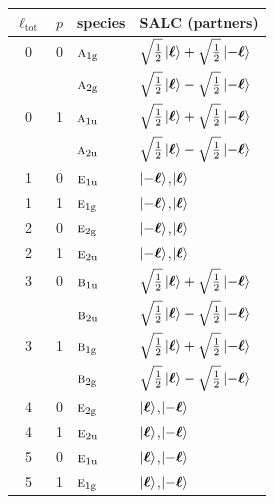 \documentclass[11pt]{article}
\newcommand{\irr}[1]{\text{\normalfont\scshape #1}}
\newcommand{\ptag}[1]{\mathrm{#1}}
\begin{document}
\begin{longtable}{c c l l}\hline $\ell_{\mathrm{tot}}$ & $p$ & species & SALC (partners)\\ \hline\endhead

0 & 0 & $\irr{a}_{1\ptag{g}}$ & $\sqrt{\tfrac{1}{2}}\ket{\boldsymbol\ell}+\sqrt{\tfrac{1}{2}}\ket{-\boldsymbol\ell}$\\

& & $\irr{a}_{2\ptag{g}}$ & $\sqrt{\tfrac{1}{2}}\ket{\boldsymbol\ell}-\sqrt{\tfrac{1}{2}}\ket{-\boldsymbol\ell}$\\

0 & 1 & $\irr{a}_{1\ptag{u}}$ & $\sqrt{\tfrac{1}{2}}\ket{\boldsymbol\ell}+\sqrt{\tfrac{1}{2}}\ket{-\boldsymbol\ell}$\\

& & $\irr{a}_{2\ptag{u}}$ & $\sqrt{\tfrac{1}{2}}\ket{\boldsymbol\ell}-\sqrt{\tfrac{1}{2}}\ket{-\boldsymbol\ell}$\\

1 & 0 & $\irr{e}_{1\ptag{u}}$ & $\ket{-\boldsymbol\ell}$,\quad $\ket{\boldsymbol\ell}$\\

1 & 1 & $\irr{e}_{1\ptag{g}}$ & $\ket{-\boldsymbol\ell}$,\quad $\ket{\boldsymbol\ell}$\\

2 & 0 & $\irr{e}_{2\ptag{g}}$ & $\ket{-\boldsymbol\ell}$,\quad $\ket{\boldsymbol\ell}$\\

2 & 1 & $\irr{e}_{2\ptag{u}}$ & $\ket{-\boldsymbol\ell}$,\quad $\ket{\boldsymbol\ell}$\\

3 & 0 & $\irr{b}_{1\ptag{u}}$ & $\sqrt{\tfrac{1}{2}}\ket{\boldsymbol\ell}+\sqrt{\tfrac{1}{2}}\ket{-\boldsymbol\ell}$\\

& & $\irr{b}_{2\ptag{u}}$ & $\sqrt{\tfrac{1}{2}}\ket{\boldsymbol\ell}-\sqrt{\tfrac{1}{2}}\ket{-\boldsymbol\ell}$\\

3 & 1 & $\irr{b}_{1\ptag{g}}$ & $\sqrt{\tfrac{1}{2}}\ket{\boldsymbol\ell}+\sqrt{\tfrac{1}{2}}\ket{-\boldsymbol\ell}$\\

& & $\irr{b}_{2\ptag{g}}$ & $\sqrt{\tfrac{1}{2}}\ket{\boldsymbol\ell}-\sqrt{\tfrac{1}{2}}\ket{-\boldsymbol\ell}$\\

4 & 0 & $\irr{e}_{2\ptag{g}}$ & $\ket{\boldsymbol\ell}$,\quad $\ket{-\boldsymbol\ell}$\\

4 & 1 & $\irr{e}_{2\ptag{u}}$ & $\ket{\boldsymbol\ell}$,\quad $\ket{-\boldsymbol\ell}$\\

5 & 0 & $\irr{e}_{1\ptag{u}}$ & $\ket{\boldsymbol\ell}$,\quad $\ket{-\boldsymbol\ell}$\\

5 & 1 & $\irr{e}_{1\ptag{g}}$ & $\ket{\boldsymbol\ell}$,\quad $\ket{-\boldsymbol\ell}$\\

\hline\end{longtable}
\end{document}
